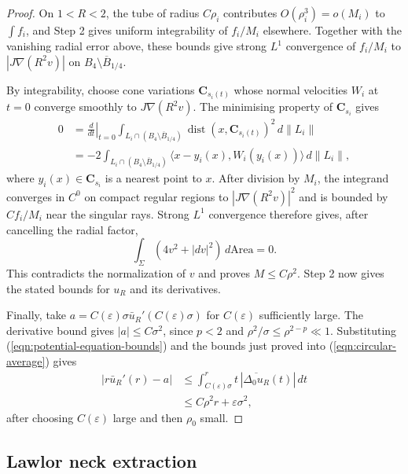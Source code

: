 \documentclass[11pt,a4paper]{article}
\numberwithin{equation}{section}
\theoremstyle{definition}
\theoremstyle{remark}
\newcommand{\dist}{\operatorname{dist}}
\begin{document}
\begin{proof}
		On $1<R<2$, the tube of radius $C\rho_i$ contributes
		$O(\rho_i^3)=o(M_i)$ to $\int f_i$, and Step 2 gives uniform
		integrability of $f_i/M_i$ elsewhere. Together with the vanishing radial
		error above, these bounds give strong $L^1$ convergence of $f_i/M_i$
		to $|J\nabla(R^2v)|$ on $B_4\setminus\overline B_{1/4}$.
		
		By integrability, choose cone variations $\mathbf C_{s_i(t)}$ whose
		normal velocities $W_i$ at $t=0$ converge smoothly to $J\nabla(R^2v)$.
		The minimising property of $\mathbf C_{s_i}$ gives
		\[
		\begin{aligned}
			0&=\left.\frac{d}{dt}\right|_{t=0}
			\int_{L_i\cap(B_4\setminus\overline B_{1/4})}
			\dist(x,\mathbf C_{s_i(t)})^2\,d\|L_i\|\\
			&=-2\int_{L_i\cap(B_4\setminus\overline B_{1/4})}
			\langle x-y_i(x),W_i(y_i(x))\rangle\,d\|L_i\|,
		\end{aligned}
		\]
		where $y_i(x)\in\mathbf C_{s_i}$ is a nearest point to $x$.
		After division by $M_i$, the integrand converges in $C^0$ on compact
		regular regions to $|J\nabla(R^2v)|^2$ and is bounded by $Cf_i/M_i$
		near the singular rays.
		Strong $L^1$ convergence therefore gives, after cancelling the radial factor,
		\[
		\int_\Sigma(4v^2+|dv|^2)\,d\mathrm{Area}=0.
		\]
		This contradicts the normalization of $v$ and proves $M\le C\rho^2$.
		Step 2 now gives the stated bounds for $u_R$ and its derivatives.
		
		Finally, take $a=C(\varepsilon)\sigma\bar u_R'(C(\varepsilon)\sigma)$
		for $C(\varepsilon)$ sufficiently large.
		The derivative bound gives $|a|\le C\sigma^2$, since $p<2$ and
		$\rho^2/\sigma\le\rho^{2-p}\ll1$.
		Substituting (\ref{eqn:potential-equation-bounds}) and the bounds just proved into
		(\ref{eqn:circular-average}) gives
		\[
		\begin{split}
			|r\bar u_R'(r)-a|
			&\le\int_{C(\varepsilon)\sigma}^r
			t\,|\overline{\Delta_0u_R}(t)|\,dt\\
			&\le C\rho^2r+\varepsilon\sigma^2,
		\end{split}
		\]
		after choosing $C(\varepsilon)$ large and then $\rho_0$ small.
	\end{proof}
	
	
	\subsection{Lawlor neck extraction}
	\label{sect:selected-neck}\label{sect:neck-estimates-stopping-radii}
	
\end{document}
